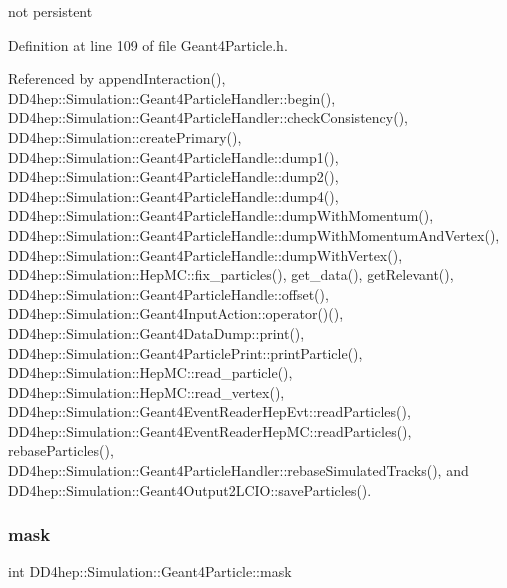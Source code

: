 not persistent 



Definition at line 109 of file Geant4\+Particle.\+h.



Referenced by append\+Interaction(), D\+D4hep\+::\+Simulation\+::\+Geant4\+Particle\+Handler\+::begin(), D\+D4hep\+::\+Simulation\+::\+Geant4\+Particle\+Handler\+::check\+Consistency(), D\+D4hep\+::\+Simulation\+::create\+Primary(), D\+D4hep\+::\+Simulation\+::\+Geant4\+Particle\+Handle\+::dump1(), D\+D4hep\+::\+Simulation\+::\+Geant4\+Particle\+Handle\+::dump2(), D\+D4hep\+::\+Simulation\+::\+Geant4\+Particle\+Handle\+::dump4(), D\+D4hep\+::\+Simulation\+::\+Geant4\+Particle\+Handle\+::dump\+With\+Momentum(), D\+D4hep\+::\+Simulation\+::\+Geant4\+Particle\+Handle\+::dump\+With\+Momentum\+And\+Vertex(), D\+D4hep\+::\+Simulation\+::\+Geant4\+Particle\+Handle\+::dump\+With\+Vertex(), D\+D4hep\+::\+Simulation\+::\+Hep\+M\+C\+::fix\+\_\+particles(), get\+\_\+data(), get\+Relevant(), D\+D4hep\+::\+Simulation\+::\+Geant4\+Particle\+Handle\+::offset(), D\+D4hep\+::\+Simulation\+::\+Geant4\+Input\+Action\+::operator()(), D\+D4hep\+::\+Simulation\+::\+Geant4\+Data\+Dump\+::print(), D\+D4hep\+::\+Simulation\+::\+Geant4\+Particle\+Print\+::print\+Particle(), D\+D4hep\+::\+Simulation\+::\+Hep\+M\+C\+::read\+\_\+particle(), D\+D4hep\+::\+Simulation\+::\+Hep\+M\+C\+::read\+\_\+vertex(), D\+D4hep\+::\+Simulation\+::\+Geant4\+Event\+Reader\+Hep\+Evt\+::read\+Particles(), D\+D4hep\+::\+Simulation\+::\+Geant4\+Event\+Reader\+Hep\+M\+C\+::read\+Particles(), rebase\+Particles(), D\+D4hep\+::\+Simulation\+::\+Geant4\+Particle\+Handler\+::rebase\+Simulated\+Tracks(), and D\+D4hep\+::\+Simulation\+::\+Geant4\+Output2\+L\+C\+I\+O\+::save\+Particles().

\hypertarget{class_d_d4hep_1_1_simulation_1_1_geant4_particle_a907e9a43cf268196ff3b3e9e1be52b57}{}\label{class_d_d4hep_1_1_simulation_1_1_geant4_particle_a907e9a43cf268196ff3b3e9e1be52b57} 
\subsubsection{\texorpdfstring{mask}{mask}}
{\footnotesize\ttfamily int D\+D4hep\+::\+Simulation\+::\+Geant4\+Particle\+::mask}



